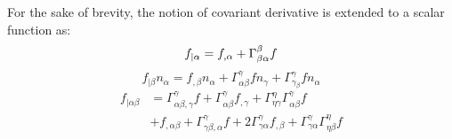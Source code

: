For the sake of brevity, the notion of covariant derivative is extended to a scalar function as:
\begin{equation}
f_{\vert\alpha} = f_{,\alpha} + \Gamma^\beta_{\beta\alpha} f \\
\end{equation}
\begin{equation}
f_{\vert\beta} n_\alpha = f_{,\beta}n_\alpha + \Gamma^\gamma_{\alpha\beta} f n_\gamma + \Gamma^\gamma_{\gamma_\beta} f n_\alpha
\end{equation}
\begin{equation}
\begin{split}
f_{\vert\alpha\beta} &=
\Gamma^\gamma_{\alpha\beta,\gamma}f + \Gamma^\gamma_{\alpha\beta} f_{,\gamma} + \Gamma^\eta_{\eta\gamma}\Gamma^\gamma_{\alpha\beta} f \\
&+ f_{,\alpha\beta} + \Gamma^\gamma_{\gamma\beta,\alpha}f+2\Gamma^\gamma_{\gamma\alpha}f_{,\beta} + \Gamma^{\gamma}_{\gamma\alpha}\Gamma^\eta_{\eta\beta} f
\end{split}
\end{equation}
